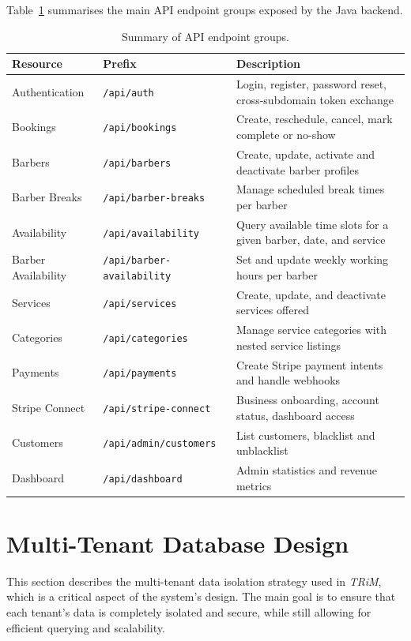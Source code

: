 Table~\ref{tab:api-endpoints} summarises the main API endpoint groups exposed by the Java backend.

\begin{table}[H]
    \centering
    \begin{tabularx}{\textwidth}{|l|l|X|}
    \hline
    \textbf{Resource} & \textbf{Prefix} & \textbf{Description} \\
    \hline
    Authentication & \texttt{/api/auth} & Login, register, password reset, cross-subdomain token exchange \\
    \hline
    Bookings & \texttt{/api/bookings} & Create, reschedule, cancel, mark complete or no-show \\
    \hline
    Barbers & \texttt{/api/barbers} & Create, update, activate and deactivate barber profiles \\
    \hline
    Barber Breaks & \texttt{/api/barber-breaks} & Manage scheduled break times per barber \\
    \hline
    Availability & \texttt{/api/availability} & Query available time slots for a given barber, date, and service \\
    \hline
    Barber Availability & \texttt{/api/barber-availability} & Set and update weekly working hours per barber \\
    \hline
    Services & \texttt{/api/services} & Create, update, and deactivate services offered \\
    \hline
    Categories & \texttt{/api/categories} & Manage service categories with nested service listings \\
    \hline
    Payments & \texttt{/api/payments} & Create Stripe payment intents and handle webhooks \\
    \hline
    Stripe Connect & \texttt{/api/stripe-connect} & Business onboarding, account status, dashboard access \\
    \hline
    Customers & \texttt{/api/admin/customers} & List customers, blacklist and unblacklist \\
    \hline
    Dashboard & \texttt{/api/dashboard} & Admin statistics and revenue metrics \\
    \hline
    \end{tabularx}
    \caption{Summary of API endpoint groups.}
    \label{tab:api-endpoints}
\end{table}

\section{Multi-Tenant Database Design}
This section describes the multi-tenant data isolation strategy used in \textit{TRiM}, which is a critical aspect of the system's design. The main goal is to ensure that each tenant's data is completely isolated and secure, while still allowing for efficient querying and scalability.

